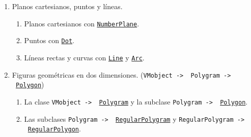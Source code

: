 \documentclass[a4paper]{article}
\begin{document}
\begin{enumerate}

    \item Planos cartesianos, puntos y líneas.
    \begin{enumerate}[label=5.\arabic*]

        \item Planos cartesianos con \href{https://docs.manim.community/en/v0.16.0.post0/reference/manim.mobject.graphing.coordinate_systems.NumberPlane.html?highlight=NumberPlane}{\texttt{NumberPlane}}.

        \item Puntos con \href{https://docs.manim.community/en/v0.16.0.post0/reference/manim.mobject.geometry.arc.Dot.html?highlight=Dot}{\texttt{Dot}}.

        \item Líneas rectas y curvas con \href{https://docs.manim.community/en/v0.16.0.post0/reference/manim.mobject.geometry.line.Line.html#manim.mobject.geometry.line.Line}{\texttt{Line}} y \href{https://docs.manim.community/en/v0.16.0.post0/reference/manim.mobject.geometry.arc.Arc.html?highlight=Arc}{\texttt{Arc}}.
    \end{enumerate}

    \item Figuras geométricas en dos dimensiones. (\texttt{VMobject -> \ Polygram -> \ \href{https://docs.manim.community/en/v0.16.0.post0/reference/manim.mobject.geometry.polygram.Polygon.html?highlight=Polygon}{Polygon}})
    \begin{enumerate}[label=2.\arabic*]

        \item La clase \texttt{VMobject -> \ \href{https://docs.manim.community/en/v0.16.0.post0/reference/manim.mobject.geometry.polygram.Polygram.html?highlight=polygram}{Polygram}} y la subclase \texttt{Polygram -> \ \href{https://docs.manim.community/en/v0.16.0.post0/reference/manim.mobject.geometry.polygram.Polygon.html?highlight=polygon}{Polygon}}.

        \item Las subclases \texttt{Polygram -> \ \href{https://docs.manim.community/en/v0.16.0.post0/reference/manim.mobject.geometry.polygram.RegularPolygram.html?highlight=RegularPolygram}{RegularPolygram}} y \texttt{RegularPolygram -> \ \href{https://docs.manim.community/en/v0.16.0.post0/reference/manim.mobject.geometry.polygram.RegularPolygon.html?highlight=RegularPolygon}{RegularPolygon}}.
    \end{enumerate}


\end{enumerate}
\end{document}
